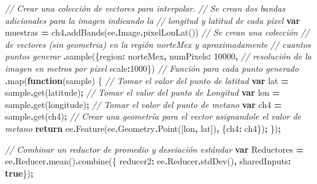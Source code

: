 \documentclass[
  12pt,
  letterpaper,
  twoside]{book}
\newenvironment{Shaded}{\begin{snugshade}}{\end{snugshade}}
\newcommand{\AttributeTok}[1]{\textcolor[rgb]{0.77,0.63,0.00}{#1}}
\newcommand{\CommentTok}[1]{\textcolor[rgb]{0.56,0.35,0.01}{\textit{#1}}}
\newcommand{\ControlFlowTok}[1]{\textcolor[rgb]{0.13,0.29,0.53}{\textbf{#1}}}
\newcommand{\DataTypeTok}[1]{\textcolor[rgb]{0.13,0.29,0.53}{#1}}
\newcommand{\DecValTok}[1]{\textcolor[rgb]{0.00,0.00,0.81}{#1}}
\newcommand{\FunctionTok}[1]{\textcolor[rgb]{0.00,0.00,0.00}{#1}}
\newcommand{\KeywordTok}[1]{\textcolor[rgb]{0.13,0.29,0.53}{\textbf{#1}}}
\newcommand{\NormalTok}[1]{#1}
\newcommand{\OperatorTok}[1]{\textcolor[rgb]{0.81,0.36,0.00}{\textbf{#1}}}
\newcommand{\StringTok}[1]{\textcolor[rgb]{0.31,0.60,0.02}{#1}}
\begin{document}
\begin{Shaded}
\begin{Highlighting}[]
\CommentTok{// Crear una colección de vectores para interpolar.}
\CommentTok{// Se crean dos bandas adicionales para la imagen indicando la }
\CommentTok{// longitud y latitud de cada píxel}
\KeywordTok{var}\NormalTok{ muestras }\OperatorTok{=}\NormalTok{ ch4}\OperatorTok{.}\FunctionTok{addBands}\NormalTok{(ee}\OperatorTok{.}\AttributeTok{Image}\OperatorTok{.}\FunctionTok{pixelLonLat}\NormalTok{()) }
  \CommentTok{// Se crean una colección }
  \CommentTok{// de vectores (sin geometria) en la región norteMex y aproximadamente }
  \CommentTok{// cuantos puntos generar}
  \OperatorTok{.}\FunctionTok{sample}\NormalTok{(\{}\DataTypeTok{region}\OperatorTok{:}\NormalTok{ norteMex}\OperatorTok{,} \DataTypeTok{numPixels}\OperatorTok{:} \DecValTok{10000}\OperatorTok{,} 
    \CommentTok{// resolución de la imagen en metros por píxel}
    \DataTypeTok{scale}\OperatorTok{:}\DecValTok{1000}\NormalTok{\}) }
  \CommentTok{// Función para cada punto generado}
  \OperatorTok{.}\FunctionTok{map}\NormalTok{(}\KeywordTok{function}\NormalTok{(sample) \{ }
    \CommentTok{// Tomar el valor del punto de latitud}
    \KeywordTok{var}\NormalTok{ lat }\OperatorTok{=}\NormalTok{ sample}\OperatorTok{.}\FunctionTok{get}\NormalTok{(}\StringTok{\textquotesingle{}latitude\textquotesingle{}}\NormalTok{)}\OperatorTok{;} 
    \CommentTok{// Tomar el valor del punto de Longitud}
    \KeywordTok{var}\NormalTok{ lon }\OperatorTok{=}\NormalTok{ sample}\OperatorTok{.}\FunctionTok{get}\NormalTok{(}\StringTok{\textquotesingle{}longitude\textquotesingle{}}\NormalTok{)}\OperatorTok{;} 
    \CommentTok{// Tomar el valor del punto de metano}
    \KeywordTok{var}\NormalTok{ ch4 }\OperatorTok{=}\NormalTok{ sample}\OperatorTok{.}\FunctionTok{get}\NormalTok{(}\StringTok{\textquotesingle{}ch4\textquotesingle{}}\NormalTok{)}\OperatorTok{;} 
    \CommentTok{// Crear una geometría para el vector asignandole el valor de metano}
    \ControlFlowTok{return}\NormalTok{ ee}\OperatorTok{.}\FunctionTok{Feature}\NormalTok{(ee}\OperatorTok{.}\AttributeTok{Geometry}\OperatorTok{.}\FunctionTok{Point}\NormalTok{([lon}\OperatorTok{,}\NormalTok{ lat])}\OperatorTok{,}\NormalTok{ \{}\DataTypeTok{ch4}\OperatorTok{:}\NormalTok{ ch4\})}\OperatorTok{;}
\NormalTok{  \})}\OperatorTok{;}

\CommentTok{// Combinar un reductor de promedio y desviación estándar}
\KeywordTok{var}\NormalTok{ Reductores }\OperatorTok{=}\NormalTok{ ee}\OperatorTok{.}\AttributeTok{Reducer}\OperatorTok{.}\FunctionTok{mean}\NormalTok{()}\OperatorTok{.}\FunctionTok{combine}\NormalTok{(\{}
  \DataTypeTok{reducer2}\OperatorTok{:}\NormalTok{ ee}\OperatorTok{.}\AttributeTok{Reducer}\OperatorTok{.}\FunctionTok{stdDev}\NormalTok{()}\OperatorTok{,}
  \DataTypeTok{sharedInputs}\OperatorTok{:} \KeywordTok{true}\NormalTok{\})}\OperatorTok{;}


\end{Highlighting}
\end{Shaded}
\end{document}
